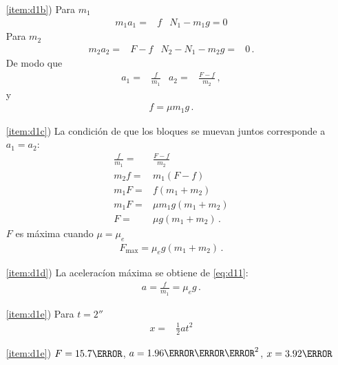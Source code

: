 \begin{enumerate}
  \begin{itemize}
  \item[\ref{item:d1b})] Para $m_1$
    \begin{align}
      \label{eq:d11}
      m_1 a_1=&f & N_1-m_1 g=0
    \end{align}
Para $m_2$
\begin{align*}
  m_2 a_2=&F-f & N_2-N_1-m_2g=&0\,.
\end{align*}
    De modo que
    \begin{align*}
      a_1=&\frac{f}{m_1}& a_2=&\frac{F-f}{m_2}\,,
    \end{align*}
    y
    \begin{align*}
      f=\mu m_1 g\,.
    \end{align*}
  \item[\ref{item:d1c})]
    La condición de que los bloques se muevan juntos corresponde a $a_1=a_2$:
    \begin{align*}
      \frac{f}{m_1}=&\frac{F-f}{m_2}\\
      m_2 f =&m_1(F-f)\\
      m_1F =&f(m_1+m_2)\\
      m_1F =&\mu m_1 g(m_1+m_2)\\
      F =&\mu g(m_1+m_2)\,. 
    \end{align*}
    $F$ es máxima cuando $\mu=\mu_e$
    \begin{align*}
      F_{\text{max}}=\mu_e g(m_1+m_2)\,. 
    \end{align*}

    \item[\ref{item:d1d})] La aceleracíon máxima se obtiene de \eqref{eq:d11}:
      \begin{align*}
        a=\frac{f}{m_1}=\mu_e g\,.
      \end{align*}
    \item[\ref{item:d1e})] Para $t=2\second$
      \begin{align*}
        x=&\frac{1}{2}a t^2
      \end{align*}
    \item[\ref{item:d1e})] $F=15.7\newton$, $a=1.96\meter\per\second^2$, $x=3.92\meter$

    \end{itemize}
\end{enumerate}

